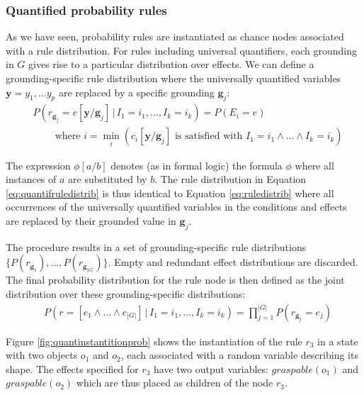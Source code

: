 \subsubsection*{Quantified probability rules}

As we have seen, probability rules are instantiated as chance nodes associated with a rule distribution.  For rules including universal quantifiers, each grounding in $G$ gives rise to a particular distribution over effects.   We can define a grounding-specific rule distribution where the universally quantified variables $\mathbf{y} = y_1,... y_p$ are replaced by a specific grounding $\mathbf{g}_j$:
\begin{align}
& P(r_{\mathbf{g}_j}\!=\!e [\mathbf{y} / \mathbf{g}_j] \, | \, I_1\!=\!i_1, \dots, I_k\!=\!i_k) = P(E_i = e) \label{eq:quantifruledistrib}
 \\
& \; \; \; \; \; \; \; \; \text{where } i = \min_i (c_i[\mathbf{y} / \mathbf{g}_j]\text{ is satisfied with } I_1\!=\!i_1 \land \dots \land I_k\!=\!i_k) \nonumber \end{align}

The expression $\phi[a/b]$ denotes (as in formal logic) the formula $\phi$ where all instances of $a$ are substituted by $b$. The rule distribution in Equation \eqref{eq:quantifruledistrib} is thus identical to Equation \eqref{eq:ruledistrib} where all occurrences of the universally quantified variables in the conditions and effects are replaced by their grounded value in $\mathbf{g}_j$.

The procedure results in a set of grounding-specific rule distributions $ \{ P(r_{\mathbf{g}_1}), \dots, P(r_{\mathbf{g}_{|G|}}) \}$. Empty and redundant effect distributions are discarded. The final probability distribution for the rule node is then defined as the joint distribution over these grounding-specific distributions: 
\begin{align}
& P(r\!=\![e_1 \land \dots \land e_{|G|}] \, | \, I_1\!=\!i_1, \dots, I_k\!=\!i_k) = \prod_{j=1}^{|G|} P(r_{\mathbf{g}_j}\!=\!e_j)
\end{align}


Figure \ref{fig:quantinstantitionprob} shows the instantiation of the rule $r_3$ in a state with two objects $o_1$ and $o_2$, each associated with a random variable describing its shape. The effects specified for $r_3$ have two output variables: $\mathit{graspable}(o_1)$ and $\mathit{graspable}(o_2)$ which are thus placed as children of the node $r_3$.  

